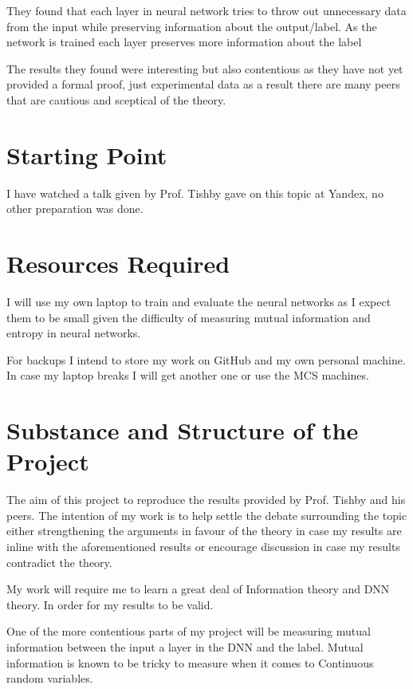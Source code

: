 \documentclass[12pt]{article}
\begin{document}
They found that each layer in neural network tries to throw out unnecessary data
from the input while preserving information about the output/label. As the
network is trained each layer preserves more information about the label

The results they found were interesting but also contentious as they have not
yet provided a formal proof, just experimental data as a result there are many
peers that are cautious and sceptical of the theory.

\section*{Starting Point}

I have watched a talk given by Prof. Tishby gave on this topic at Yandex, no other
preparation was done. 

\section*{Resources Required}

I will use my own laptop to train and evaluate the neural networks as I expect
them to be small given the difficulty of measuring mutual information and
entropy in neural networks.

For backups I intend to store my work on GitHub and my own personal machine. In
case my laptop breaks I will get another one or use the MCS machines.

\section*{Substance and Structure of the Project}

The aim of this project to reproduce the results provided by Prof. Tishby and
his peers. The intention of my work is to help settle the debate surrounding the
topic either strengthening the arguments in favour of the theory in case my
results are inline with the aforementioned results or encourage discussion in
case my results contradict the theory.

My work will require me to learn a great deal of Information theory and DNN
theory. In order for my results to be valid.

One of the more contentious parts of my project will be measuring mutual
information between the input a layer in the DNN and the label. Mutual
information is known to be tricky to measure when it comes to Continuous random
variables.
\end{document}
